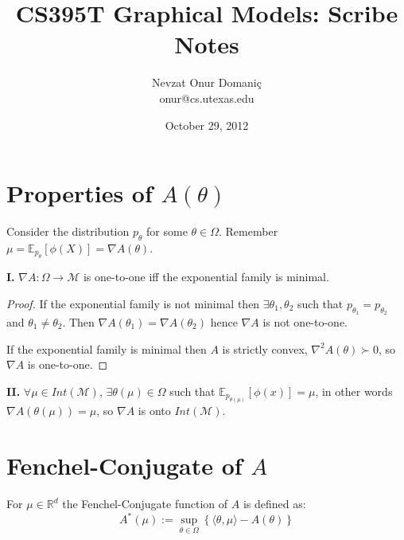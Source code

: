 \documentclass[11pt]{article}
\title{CS395T Graphical Models: Scribe Notes}
\author{Nevzat Onur Domani\c{c} \\ onur@cs.utexas.edu}
\date{October 29, 2012}
\theoremstyle{definition} \newtheorem{definition}{Definition}
\theoremstyle{definition} \newtheorem{observation}[definition]{Observation}
\theoremstyle{definition} \newtheorem{proposition}[definition]{Proposition}
\theoremstyle{definition} \newtheorem{lemma}[definition]{Lemma}
\theoremstyle{definition} \newtheorem{corollary}[definition]{Corollary}
\theoremstyle{definition} \newtheorem{theorem}[definition]{Theorem}
\newcommand{\R}{\mathbb{R}}
\newcommand{\Mu}{\mathcal{M}}
\newcommand{\E}{\mathbb{E}}
\newcommand{\cbr}[1]{\left\{ #1 \right\}}
\newcommand{\sbr}[1]{\left[ #1 \right]}
\newcommand{\seq}[1]{\langle #1 \rangle}
\begin{document}
\maketitle

\section{Properties of $A(\theta)$}
\label{sec:properties-a}

Consider the distribution $p_\theta$ for some $\theta \in \Omega$.
Remember $\mu = \E_{p_\theta}\sbr{\phi(X)} = \nabla A(\theta)$.

\textbf{I.} $\nabla A:\Omega \to \Mu$ is one-to-one iff the exponential family
is minimal.

\begin{proof}
  If the exponential family is not minimal then $\exists \theta_1,
  \theta_2$ such that $p_{\theta_1} = p_{\theta_2}$ and $\theta_1
  \neq \theta_2$.  Then $\nabla A(\theta_1) = \nabla A(\theta_2)$
  hence $\nabla A$ is not one-to-one.

  If the exponential family is minimal then $A$ is strictly convex,
  $\nabla^2 A(\theta) \succ 0$, so $\nabla A$ is one-to-one.
\end{proof}

\textbf{II.} $\forall \mu \in Int(\Mu)$, $\exists \theta(\mu) \in
\Omega$ such that $\E_{p_{\theta(\mu)}}\sbr{\phi(x)} = \mu$, in other
words $\nabla A(\theta(\mu)) = \mu$, so $\nabla A$ is onto $Int(\Mu)$.

\section{Fenchel-Conjugate of $A$}
\label{sec:fenchel-conjugate-a}

For $\mu \in \R^d$ the Fenchel-Conjugate function of $A$ is defined as:
\[ A^*(\mu) := \sup_{\theta \in \Omega} \cbr{\seq{\theta, \mu} -
  A(\theta)} \]
\end{document}
